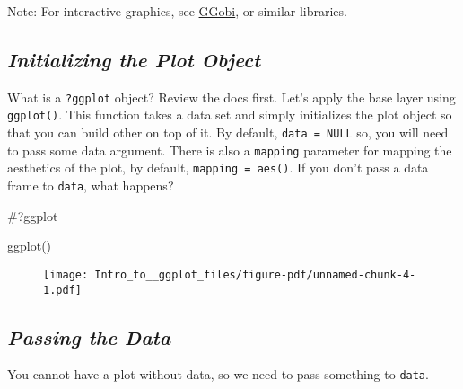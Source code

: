 \documentclass[
  letterpaper,
  DIV=11,
  numbers=noendperiod]{scrartcl}
\newenvironment{Shaded}{\begin{snugshade}}{\end{snugshade}}
\newcommand{\CommentTok}[1]{\textcolor[rgb]{0.37,0.37,0.37}{#1}}
\newcommand{\FunctionTok}[1]{\textcolor[rgb]{0.28,0.35,0.67}{#1}}
\newcommand{\NormalTok}[1]{\textcolor[rgb]{0.00,0.23,0.31}{#1}}
\begin{document}
Note: For interactive graphics, see \href{http://ggobi.org/}{GGobi}, or
similar libraries.

\hypertarget{initializing-the-plot-object}{%
\subsection{\texorpdfstring{\emph{Initializing the Plot
Object}}{Initializing the Plot Object}}\label{initializing-the-plot-object}}

What is a \texttt{?ggplot} object? Review the docs first. Let's apply
the base layer using \texttt{ggplot()}. This function takes a data set
and simply initializes the plot object so that you can build other on
top of it. By default, \texttt{data\ =\ NULL} so, you will need to pass
some data argument. There is also a \texttt{mapping} parameter for
mapping the aesthetics of the plot, by default,
\texttt{mapping\ =\ aes()}. If you don't pass a data frame to
\texttt{data}, what happens?

\begin{Shaded}
\begin{Highlighting}[]
\CommentTok{\#?ggplot}

\FunctionTok{ggplot}\NormalTok{()}
\end{Highlighting}
\end{Shaded}

\begin{figure}[H]

{\centering \texttt{[image: Intro\_to\_\_ggplot\_files/figure-pdf/unnamed-chunk-4-1.pdf]}

}

\end{figure}

\hypertarget{passing-the-data}{%
\subsection{\texorpdfstring{\emph{Passing the
Data}}{Passing the Data}}\label{passing-the-data}}

You cannot have a plot without data, so we need to pass something to
\texttt{data}.
\end{document}

